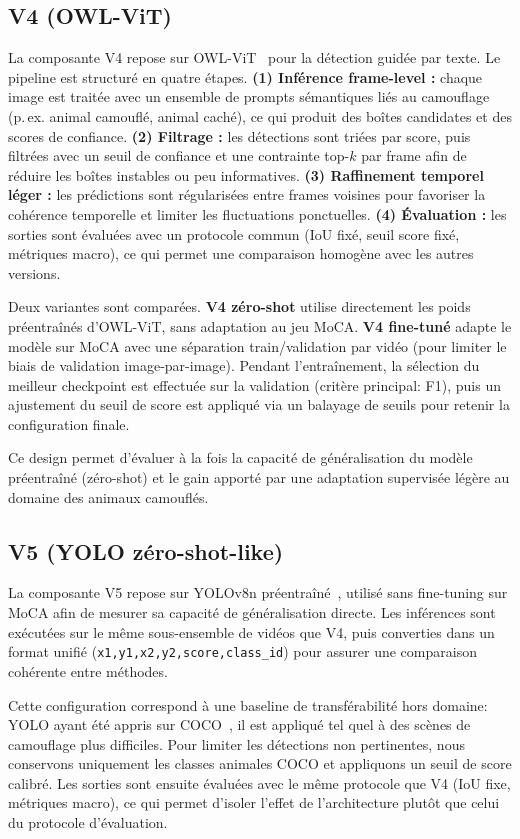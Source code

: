 \documentclass{article}
\begin{document}
\subsection{V4 (OWL-ViT)}
La composante V4 repose sur OWL-ViT~\cite{minderer2022owlvit,huggingface_owlvit_model} pour la détection guidée par texte. Le pipeline est structuré en quatre étapes. 
\textbf{(1) Inférence frame-level :} chaque image est traitée avec un ensemble de prompts sémantiques liés au camouflage (p.\,ex. animal camouflé, animal caché), ce qui produit des boîtes candidates et des scores de confiance. 
\textbf{(2) Filtrage :} les détections sont triées par score, puis filtrées avec un seuil de confiance et une contrainte top-$k$ par frame afin de réduire les boîtes instables ou peu informatives. 
\textbf{(3) Raffinement temporel léger :} les prédictions sont régularisées entre frames voisines pour favoriser la cohérence temporelle et limiter les fluctuations ponctuelles. 
\textbf{(4) Évaluation :} les sorties sont évaluées avec un protocole commun (IoU fixé, seuil score fixé, métriques macro), ce qui permet une comparaison homogène avec les autres versions.

Deux variantes sont comparées. 
\textbf{V4 zéro-shot} utilise directement les poids préentraînés d’OWL-ViT, sans adaptation au jeu MoCA. 
\textbf{V4 fine-tuné} adapte le modèle sur MoCA avec une séparation train/validation par vidéo (pour limiter le biais de validation image-par-image). Pendant l’entraînement, la sélection du meilleur checkpoint est effectuée sur la validation (critère principal: F1), puis un ajustement du seuil de score est appliqué via un balayage de seuils pour retenir la configuration finale. 

Ce design permet d’évaluer à la fois la capacité de généralisation du modèle préentraîné (zéro-shot) et le gain apporté par une adaptation supervisée légère au domaine des animaux camouflés.


\subsection{V5 (YOLO zéro-shot-like)}
La composante V5 repose sur YOLOv8n préentraîné~\cite{ultralytics_yolov8}, utilisé sans fine-tuning sur MoCA afin de mesurer sa capacité de généralisation directe. Les inférences sont exécutées sur le même sous-ensemble de vidéos que V4, puis converties dans un format unifié (\texttt{x1,y1,x2,y2,score,class\_id}) pour assurer une comparaison cohérente entre méthodes.

Cette configuration correspond à une baseline de transférabilité hors domaine: YOLO ayant été appris sur COCO~\cite{lin2014coco}, il est appliqué tel quel à des scènes de camouflage plus difficiles. Pour limiter les détections non pertinentes, nous conservons uniquement les classes animales COCO et appliquons un seuil de score calibré. Les sorties sont ensuite évaluées avec le même protocole que V4 (IoU fixe, métriques macro), ce qui permet d’isoler l’effet de l’architecture plutôt que celui du protocole d’évaluation.
\end{document}
